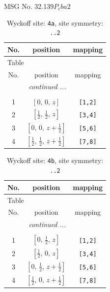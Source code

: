 \documentclass[fleqn,8pt]{jsarticle}
\begin{document}
\setcounter{MaxMatrixCols}{32}

\renewcommand{\tablename}{Table~}
\renewcommand{\figurename}{Figure~}
\begin{center}
\LARGE
MSG No. 32.139\quad$P_{c}ba2$
\end{center}
\renewcommand{\arraystretch}{1.2}
\begin{longtable}{ccc}
\caption{Wyckoff site: {\tt 4a}, site symmetry: {\tt ..2}}
 \\
 \hline \hline
No. & position & mapping \\ \hline \endfirsthead

\multicolumn{2}{l}{\tablename\ \thetable{}} \\
 \hline \hline
No. & position & mapping \\ \hline \endhead

 \hline \hline
\multicolumn{2}{r}{\footnotesize\it continued ...} \\ \endfoot

 \hline \hline
\multicolumn{2}{r}{} \\ \endlastfoot

1 & $\left[ 0,\, 0,\, z \right]$ & {\tt [1,2]} \\ \hline
2 & $\left[ \frac{1}{2},\, \frac{1}{2},\, z \right]$ & {\tt [3,4]} \\ \hline
3 & $\left[ 0,\, 0,\, z + \frac{1}{2} \right]$ & {\tt [5,6]} \\ \hline
4 & $\left[ \frac{1}{2},\, \frac{1}{2},\, z + \frac{1}{2} \right]$ & {\tt [7,8]} \\
\end{longtable}
\renewcommand{\arraystretch}{1.2}
\begin{longtable}{ccc}
\caption{Wyckoff site: {\tt 4b}, site symmetry: {\tt ..2}}
 \\
 \hline \hline
No. & position & mapping \\ \hline \endfirsthead

\multicolumn{2}{l}{\tablename\ \thetable{}} \\
 \hline \hline
No. & position & mapping \\ \hline \endhead

 \hline \hline
\multicolumn{2}{r}{\footnotesize\it continued ...} \\ \endfoot

 \hline \hline
\multicolumn{2}{r}{} \\ \endlastfoot

1 & $\left[ 0,\, \frac{1}{2},\, z \right]$ & {\tt [1,2]} \\ \hline
2 & $\left[ \frac{1}{2},\, 0,\, z \right]$ & {\tt [3,4]} \\ \hline
3 & $\left[ 0,\, \frac{1}{2},\, z + \frac{1}{2} \right]$ & {\tt [5,6]} \\ \hline
4 & $\left[ \frac{1}{2},\, 0,\, z + \frac{1}{2} \right]$ & {\tt [7,8]} \\
\end{longtable}
\end{document}
